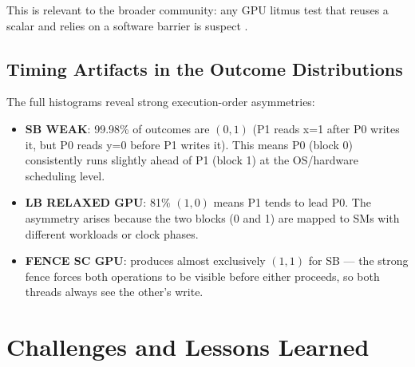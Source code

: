 \documentclass[a4paper]{article}
\begin{document}
This is relevant to the broader community: any GPU litmus test that reuses a scalar and relies on a software barrier is suspect \cite{Sorensen2016InterWorkgroup}.

\subsection{Timing Artifacts in the Outcome Distributions}

The full histograms reveal strong execution-order asymmetries:
\begin{itemize}
  \item \textbf{SB WEAK}: 99.98\% of outcomes are $(0,1)$ (P1 reads x=1 after P0 writes it, but P0 reads y=0 before P1 writes it). This means P0 (block 0) consistently runs slightly ahead of P1 (block 1) at the OS/hardware scheduling level.
  \item \textbf{LB RELAXED GPU}: 81\% $(1,0)$ means P1 tends to lead P0. The asymmetry arises because the two blocks (0 and 1) are mapped to SMs with different workloads or clock phases.
  \item \textbf{FENCE SC GPU}: produces almost exclusively $(1,1)$ for SB — the strong fence forces both operations to be visible before either proceeds, so both threads always see the other's write.
\end{itemize}

\section{Challenges and Lessons Learned}
\end{document}
